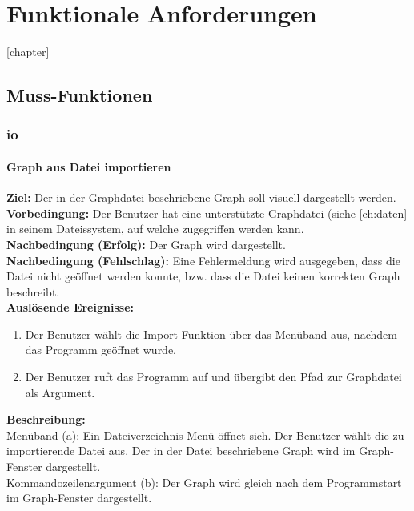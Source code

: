 \chapter{Funktionale Anforderungen}
\label{ch:funktionen}

[chapter]
\setcounter{fanr}{10}
\newcommand{\fano}[1]{\subsubsection{#1}\addtocounter{fanr}{10}}
\newcommand{\subfano}[1]{\subsubsection{#1}\addtocounter{fanr}{1}}
\renewcommand\thesubsubsection{/FA\ifnum\value{fanr}<10 00\else\ifnum\value{fanr}<100 0\fi\fi\arabic{fanr}/}

\section{Muss-Funktionen}
\subsection{\gls{io}}

\fano{Graph aus Datei importieren}\label{fa:import}
\textbf{Ziel:} Der in der Graphdatei beschriebene Graph soll visuell dargestellt werden.\\
\textbf{Vorbedingung:} Der Benutzer hat eine unterstützte Graphdatei (siehe \ref{ch:daten} in seinem Dateissystem, auf welche zugegriffen werden kann.\\
\textbf{Nachbedingung (Erfolg):} Der Graph wird dargestellt.\\
\textbf{Nachbedingung (Fehlschlag):}
Eine Fehlermeldung wird ausgegeben, dass die Datei nicht geöffnet werden konnte, bzw. dass die Datei keinen korrekten Graph beschreibt.\\
\textbf{Auslösende Ereignisse:}
\begin{enumerate}[nolistsep, label=(\alph*)]
  \item Der Benutzer wählt die Import-Funktion über das Menüband aus, nachdem das Programm geöffnet wurde. %
  \item Der Benutzer ruft das Programm auf und übergibt den Pfad zur Graphdatei als Argument. %
\end{enumerate}
\textbf{Beschreibung:}\\
Menüband (a): Ein Dateiverzeichnis-Menü öffnet sich. %
Der Benutzer wählt die zu importierende Datei aus.
Der in der Datei beschriebene Graph wird im Graph-Fenster dargestellt.\\%
Kommandozeilenargument (b): Der Graph wird gleich nach dem Programmstart im Graph-Fenster dargestellt.

